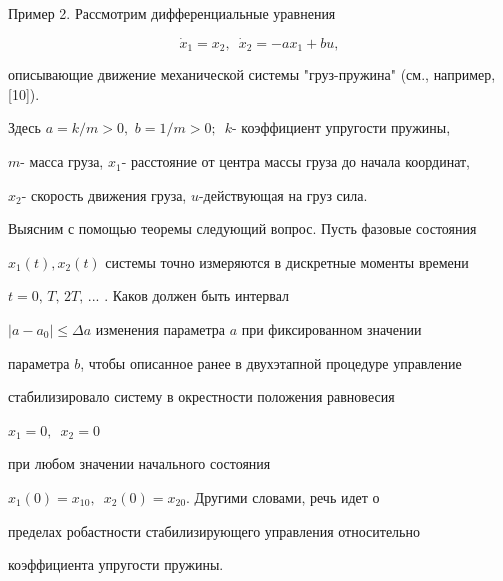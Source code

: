 \vskip 1cm














\label{end}














Пример 2. Рассмотрим дифференциальные уравнения 


$$ \dot x_1 = x_2, \, \, \, \dot x_2 = -ax_1+bu, $$


описывающие движение механической системы "груз-пружина" (см., например, [10]).


Здесь $a=k/m>0, \, \, b=1/m>0; \, \, \, k$- коэффициент упругости пружины, 


$m$- масса груза, $ x_1$- расстояние от центра массы груза до начала координат, 


$ x_2$- скорость движения груза, $u$-действующая на груз сила.





Выясним с помощью теоремы следующий вопрос. Пусть фазовые состояния


$x_1(t), x_2(t)$ системы точно измеряются в дискретные моменты времени


$ t= 0, \, T, \, 2T, \, ... \, \, $. Каков должен быть интервал 


$ |a-a_0| \le \Delta a$ изменения параметра $a$ при фиксированном значении


параметра $b$, чтобы описанное ранее в двухэтапной процедуре управление


стабилизировало систему в окрестности положения равновесия


$ x_1=0, \, \, \, x_2=0$ 


при любом значении начального состояния 


$ x_1(0)=x_{10}, \, \, \, x_2(0)=x_{20}$. Другими словами, речь идет о 


пределах робастности стабилизирующего управления относительно 


коэффициента упругости пружины.





